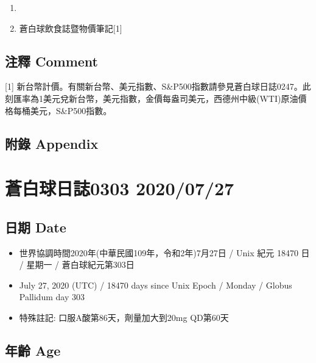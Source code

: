 \documentclass[a5paper, 11pt
]{book}
\providecommand{\tightlist}{%
  \setlength{\itemsep}{0pt}\setlength{\parskip}{0pt}}
\begin{document}
\begin{enumerate}
\def\labelenumi{\arabic{enumi}.}
\tightlist
\item
\item
  蒼白球飲食誌暨物價筆記{[}1{]}
\end{enumerate}

\hypertarget{ux6ce8ux91cb-comment-55}{%
\subsection{注釋 Comment}\label{ux6ce8ux91cb-comment-55}}

{[}1{]}
新台幣計價。有關新台幣、美元指數、S\&P500指數請參見蒼白球日誌0247。此刻匯率為1美元兌新台幣，美元指數，金價每盎司美元，西德州中級(WTI)原油價格每桶美元，S\&P500指數。

\hypertarget{ux9644ux9304-appendix-55}{%
\subsection{附錄 Appendix}\label{ux9644ux9304-appendix-55}}

\hypertarget{ux84bcux767dux7403ux65e5ux8a8c0303-20200727}{%
\section{蒼白球日誌0303
2020/07/27}\label{ux84bcux767dux7403ux65e5ux8a8c0303-20200727}}

\hypertarget{ux65e5ux671f-date-56}{%
\subsection{日期 Date}\label{ux65e5ux671f-date-56}}

\begin{itemize}
\tightlist
\item
  世界協調時間2020年(中華民國109年，令和2年)7月27日 / Unix 紀元 18470 日
  / 星期一 / 蒼白球紀元第303日
\item
  July 27, 2020 (UTC) / 18470 days since Unix Epoch / Monday / Globus
  Pallidum day 303
\item
  特殊註記: 口服A酸第86天，劑量加大到20mg QD第60天
\end{itemize}

\hypertarget{ux5e74ux9f61-age-56}{%
\subsection{年齡 Age}\label{ux5e74ux9f61-age-56}}
\end{document}
